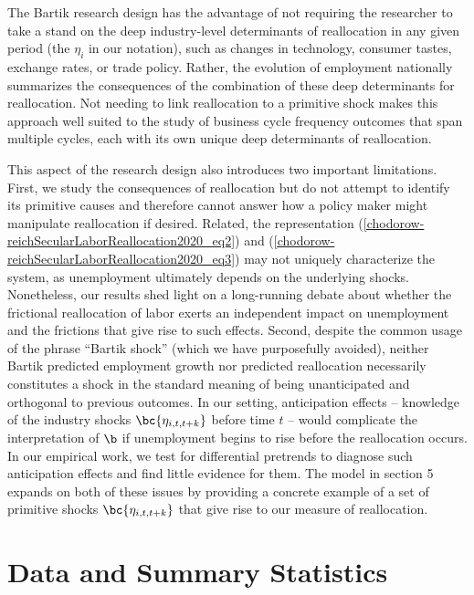 \documentclass[12pt]{article}
\newcommand{\highlightP}[1]{{\emph{\color{MyPink}{#1}}}}
\theoremstyle{definition}
\begin{document}
The Bartik research design has the advantage of not requiring the researcher to take a stand on the deep industry-level determinants of reallocation in any given period (the $\eta_i$ in our notation), such as changes in technology, consumer tastes, exchange rates, or trade policy. Rather, the evolution of employment nationally summarizes the consequences of the combination of these deep determinants for reallocation. \highlightP{The Bartik approach simply requires that the deep determinants produce a common component of industry employment growth across areas and that, after residualizing with respect to predicted area growth, these determinants affect local areas only through their effect on reallocation.} Not needing to link reallocation to a primitive shock makes this approach well suited to the study of business cycle frequency outcomes that span multiple cycles, each with its own unique deep determinants of reallocation.

This aspect of the research design also introduces two important limitations. First, we study the consequences of reallocation but do not attempt to identify its primitive causes and therefore cannot answer how a policy maker might manipulate reallocation if desired. Related, the representation (\ref{chodorow-reichSecularLaborReallocation2020_eq2}) and (\ref{chodorow-reichSecularLaborReallocation2020_eq3}) may not uniquely characterize the system, as unemployment ultimately depends on the underlying shocks. Nonetheless, our results shed light on a long-running debate about whether the frictional reallocation of labor exerts an independent impact on unemployment and the frictions that give rise to such effects. Second, despite the common usage of the phrase ``Bartik shock'' (which we have purposefully avoided), neither Bartik predicted employment growth nor predicted reallocation necessarily constitutes a shock in the standard meaning of being unanticipated and orthogonal to previous outcomes. In our setting, anticipation effects -- knowledge of the industry shocks $\bc{\eta_{i, t, t+k}}$ before time $t$ -- would complicate the interpretation of $\b$ if unemployment begins to rise before the reallocation occurs. In our empirical work, we test for differential pretrends to diagnose such anticipation effects and find little evidence for them. The model in section 5 expands on both of these issues by providing a concrete example of a set of primitive shocks $\bc{\eta_{i, t, t+k}}$ that give rise to our measure of reallocation. 


\section{Data and Summary Statistics}
\end{document}
